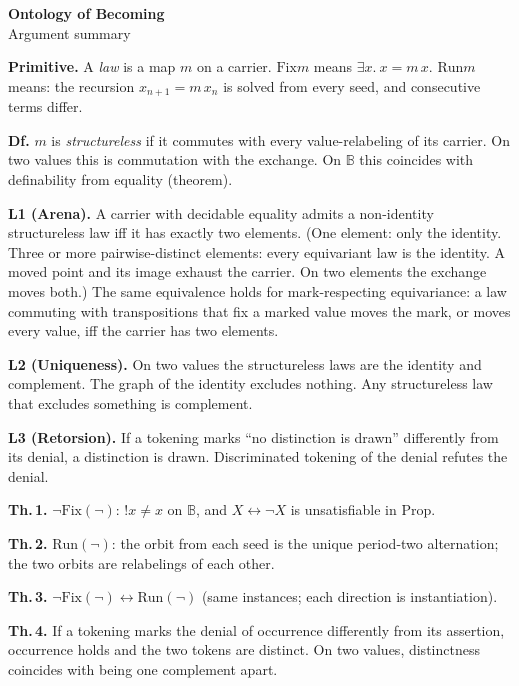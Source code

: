 \documentclass[11pt]{article}
\newcommand{\Fix}{\mathrm{Fix}}
\newcommand{\Run}{\mathrm{Run}}
\begin{document}
\begin{center}
{\Large\textbf{Ontology of Becoming}}\\[2pt]
{\small Argument summary}
\end{center}
\vspace{2pt}

\textbf{Primitive.} A \emph{law} is a map $m$ on a carrier. $\Fix m$ means $\exists x.\ x = m\,x$.
$\Run m$ means: the recursion $x_{n+1}=m\,x_n$ is solved from every seed, and consecutive
terms differ.

\textbf{Df.} $m$ is \emph{structureless} if it commutes with every value-relabeling of its
carrier. On two values this is commutation with the exchange. On $\mathbb{B}$ this coincides
with definability from equality (theorem).

\textbf{L1 (Arena).} A carrier with decidable equality admits a non-identity structureless
law iff it has exactly two elements. (One element: only the identity. Three or more
pairwise-distinct elements: every equivariant law is the identity. A moved point and its
image exhaust the carrier. On two elements the exchange moves both.) The same equivalence
holds for mark-respecting equivariance: a law commuting with transpositions that fix a
marked value moves the mark, or moves every value, iff the carrier has two elements.

\textbf{L2 (Uniqueness).} On two values the structureless laws are the identity and
complement. The graph of the identity excludes nothing. Any structureless law that excludes
something is complement.

\textbf{L3 (Retorsion).} If a tokening marks ``no distinction is drawn'' differently from
its denial, a distinction is drawn. Discriminated tokening of the denial refutes the denial.

\textbf{Th.\,1.} $\lnot\Fix(\lnot)$: $!x\neq x$ on $\mathbb{B}$, and $X\leftrightarrow\lnot X$
is unsatisfiable in $\mathrm{Prop}$.

\textbf{Th.\,2.} $\Run(\lnot)$: the orbit from each seed is the unique period-two
alternation; the two orbits are relabelings of each other.

\textbf{Th.\,3.} $\lnot\Fix(\lnot)\leftrightarrow\Run(\lnot)$ (same instances; each direction
is instantiation).

\textbf{Th.\,4.} If a tokening marks the denial of occurrence differently from its assertion,
occurrence holds and the two tokens are distinct. On two values, distinctness coincides with
being one complement apart.
\end{document}
